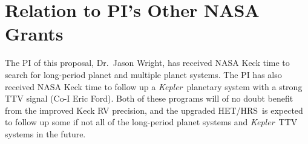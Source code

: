 \documentclass[12pt]{article}
\def\kepler{{\it Kepler}}
\def\hrs{HET/HRS}
\begin{document}
\section{Relation to PI's Other NASA Grants}

The PI of this proposal, Dr.~Jason Wright, has received NASA Keck
time to search for long-period planet and multiple planet systems.
The PI has also received NASA Keck time to follow up a
\kepler\ planetary system with a strong TTV signal (Co-I Eric
Ford). Both of these programs will of no doubt benefit from the
improved Keck RV precision, and the upgraded \hrs\ is expected to
follow up some if not all of the long-period planet systems and
\kepler\ TTV systems in the future.


\vspace{-3pt}
\begin{multicols}{2}
{\small %
 }
\end{multicols}
\end{document}

